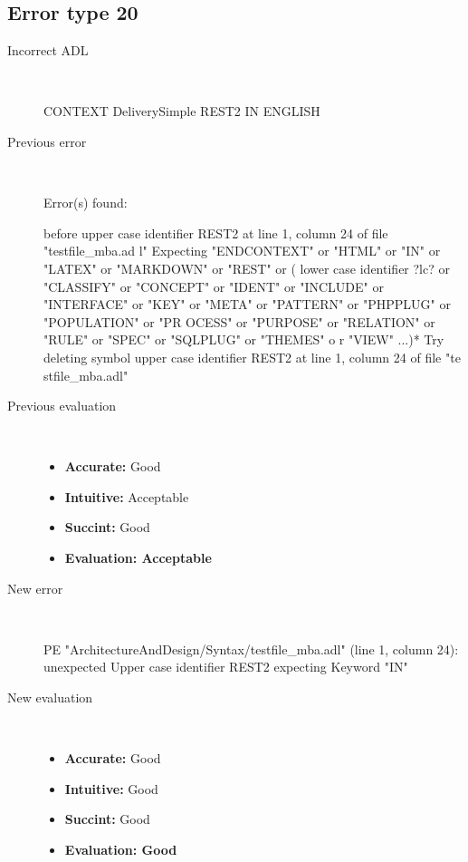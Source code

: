 \hrulefill

\subsection{Error type 20}
  \begin{description}
  \item[Incorrect ADL]~\\
\begin{adl}
CONTEXT DeliverySimple REST2 IN ENGLISH \end{adl}
  \item[Previous error]~\\
\begin{haskell}
Error(s) found:

before upper case identifier REST2 at line 1, column 24 of file "testfile_mba.ad
l"
Expecting "ENDCONTEXT" or "HTML" or "IN" or "LATEX" or "MARKDOWN" or "REST" or (
lower case identifier ?lc? or "CLASSIFY" or "CONCEPT" or "IDENT" or "INCLUDE" or
 "INTERFACE" or "KEY" or "META" or "PATTERN" or "PHPPLUG" or "POPULATION" or "PR
OCESS" or "PURPOSE" or "RELATION" or "RULE" or "SPEC" or "SQLPLUG" or "THEMES" o
r "VIEW" ...)*
Try deleting symbol upper case identifier REST2 at line 1, column 24 of file "te
stfile_mba.adl"
\end{haskell}
  \item[Previous evaluation]~\\
    \begin{itemize}
    \item \textbf{Accurate:} Good
    \item \textbf{Intuitive:} Acceptable
    \item \textbf{Succint:} Good
    \item \textbf{Evaluation: Acceptable}
    \end{itemize}
  \item[New error]~\\
\begin{haskell}
PE "ArchitectureAndDesign/Syntax/testfile_mba.adl" (line 1, column 24):
unexpected Upper case identifier REST2
expecting Keyword "IN"
\end{haskell}
  \item[New evaluation]~\\
    \begin{itemize}
    \item \textbf{Accurate:} Good
    \item \textbf{Intuitive:} Good
    \item \textbf{Succint:} Good
    \item \textbf{Evaluation: Good
}
    \end{itemize}
  \end{description}

